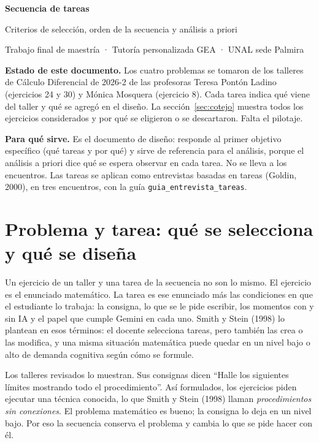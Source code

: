 \documentclass[11pt,letterpaper]{article}
\begin{document}
{\LARGE\bfseries Secuencia de tareas\par}
\smallskip
{\large Criterios de selección, orden de la secuencia y análisis a priori\par}
\smallskip
{\small Trabajo final de maestría · Tutoría personalizada GEA · UNAL sede Palmira\par}
\medskip

\noindent\textbf{Estado de este documento.} Los cuatro problemas se tomaron de los talleres de Cálculo Diferencial de 2026-2 de las profesoras Teresa Pontón Ladino (ejercicios 24 y 30) y Mónica Mosquera (ejercicio 8). Cada tarea indica qué viene del taller y qué se agregó en el diseño. La sección~\ref{sec:cotejo} muestra todos los ejercicios considerados y por qué se eligieron o se descartaron. Falta el pilotaje.

\noindent\textbf{Para qué sirve.} Es el documento de diseño: responde al primer objetivo específico (qué tareas y por qué) y sirve de referencia para el análisis, porque el análisis a priori dice qué se espera observar en cada tarea. No se lleva a los encuentros. Las tareas se aplican como entrevistas basadas en tareas (Goldin, 2000), en tres encuentros, con la guía \texttt{guia\_entrevista\_tareas}.

\section{Problema y tarea: qué se selecciona y qué se diseña}

Un ejercicio de un taller y una tarea de la secuencia no son lo mismo. El ejercicio es el enunciado matemático. La tarea es ese enunciado más las condiciones en que el estudiante lo trabaja: la consigna, lo que se le pide escribir, los momentos con y sin IA y el papel que cumple Gemini en cada uno. Smith y Stein (1998) lo plantean en esos términos: el docente selecciona tareas, pero también las crea o las modifica, y una misma situación matemática puede quedar en un nivel bajo o alto de demanda cognitiva según cómo se formule.

Los talleres revisados lo muestran. Sus consignas dicen ``Halle los siguientes límites mostrando todo el procedimiento''. Así formulados, los ejercicios piden ejecutar una técnica conocida, lo que Smith y Stein (1998) llaman \emph{procedimientos sin conexiones}. El problema matemático es bueno; la consigna lo deja en un nivel bajo. Por eso la secuencia conserva el problema y cambia lo que se pide hacer con él.
\end{document}

